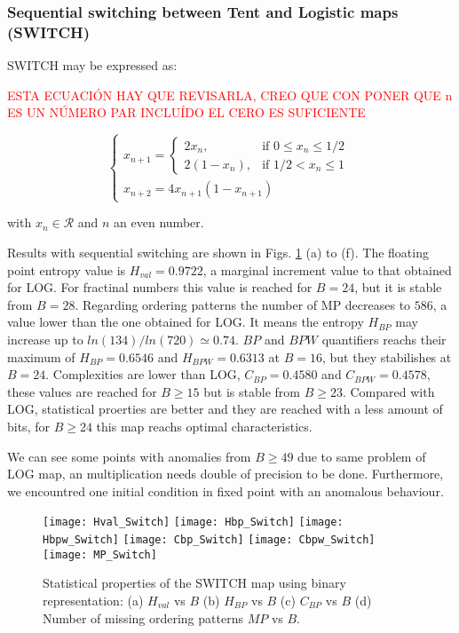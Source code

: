 \subsubsection{Sequential switching between Tent and Logistic maps (SWITCH)} \label{sssec:switch}

SWITCH may be expressed as:

\textcolor{red}{ESTA ECUACIÓN HAY QUE REVISARLA, CREO QUE CON PONER QUE n ES UN NÚMERO PAR INCLUÍDO EL CERO ES SUFICIENTE}

\begin{equation}
\begin{cases}
	x_{n+1}=
	\begin{cases}
		2x_n, & \mbox{if } 0\leq x_n\leq 1/2 \\
		2(1-x_n ), & \mbox{if } 1/2<x_n\leq 1
	\end{cases} \\
	x_{n+2}=4x_{n+1}(1-x_{n+1})
\end{cases}
\end{equation}

with $x_n\in\mathcal{R}$ and $n$ an even number.

Results with sequential switching are shown in Figs. \ref{fig:SWITCH_QuantiB} (a) to (f).
The floating point entropy value is $H_{val}=0.9722$, a marginal increment value to that obtained for LOG. 
For fractinal numbers this value is reached for $B=24$, but it is stable from $B=28$.
Regarding ordering patterns the number of MP decreases to $586$, a value lower than the one obtained for LOG.
It means the entropy $H_{BP}$ may increase up to $ln(134)/ln(720)\simeq 0.74$.
$BP$ and $BPW$ quantifiers reachs their maximum of $H_{BP}=0.6546$ and $H_{BPW}=0.6313$ at $B=16$, but they stabilishes at $B=24$.
Complexities are lower than LOG, $C_{BP}=0.4580$ and $C_{BPW}=0.4578$, these values are reached for $B \geq 15$ but is stable from $B \geq 23$.
Compared with LOG, statistical proerties are better and they are reached with a less amount of bits, for $B \geq 24$ this map reachs optimal characteristics.

We can see some points with anomalies from $B \geq 49$ due to same problem of LOG map, an multiplication needs double of precision to be done.
Furthermore, we encountred one initial condition in fixed point with an anomalous behaviour.

\begin{figure}
	\texttt{[image: Hval\_Switch]}
	\texttt{[image: Hbp\_Switch]}
	\texttt{[image: Hbpw\_Switch]}
	\texttt{[image: Cbp\_Switch]}
	\texttt{[image: Cbpw\_Switch]}
	\texttt{[image: MP\_Switch]}
	\caption{Statistical properties of the SWITCH map using binary representation: (a) $H_{val}$ vs $B$ (b) $H_{BP}$ vs $B$ (c) $C_{BP}$ vs $B$ (d) Number of missing ordering patterns $MP$ vs $B$.}
	\label{fig:SWITCH_QuantiB}
\end{figure}


